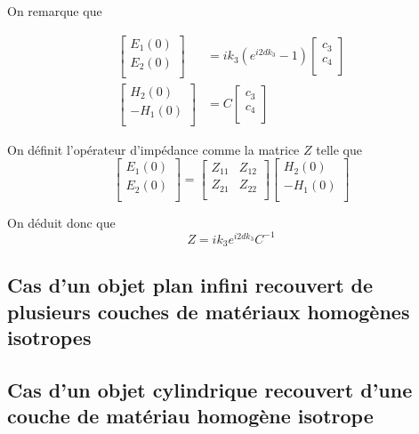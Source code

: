 On remarque que 

\begin{align}
    \begin{bmatrix}
        E_1(0)\\
        E_2(0)\\
    \end{bmatrix}
    & = ik_3\left(e^{i2dk_3} - 1\right)
    \begin{bmatrix}
        c_3 \\
        c_4 \\
    \end{bmatrix}\\
    \begin{bmatrix}
        H_2(0)\\
        -H_1(0)\\
    \end{bmatrix}
    & = C
    \begin{bmatrix}
        c_3 \\
        c_4 \\
    \end{bmatrix}
\end{align}

On définit l'opérateur d'impédance comme la matrice $Z$ telle que 
\begin{equation}
    \begin{bmatrix}
        E_1(0)\\
        E_2(0)\\
    \end{bmatrix}
    =
    \begin{bmatrix}
        Z_{11} & Z_{12} \\
        Z_{21} & Z_{22} \\
    \end{bmatrix}
    \begin{bmatrix}
        H_2(0)\\
        -H_1(0)\\
    \end{bmatrix}
\end{equation}

On déduit donc que
\begin{equation}
    Z =  ik_3e^{i2dk_3} C^{-1}
\end{equation}


\subsection{Cas d'un objet plan infini recouvert de plusieurs couches de matériaux homogènes isotropes}


\subsection{Cas d'un objet cylindrique recouvert d'une couche de matériau homogène isotrope}

